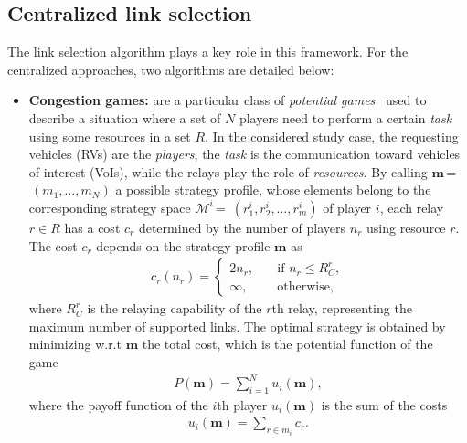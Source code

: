 \documentclass[journal]{IEEEtran}
\begin{document}
\subsection{Centralized link selection}

The link selection algorithm plays a key role in this framework. For the centralized approaches, two algorithms are detailed below:

\begin{itemize}[wide]
    \item \textbf{Congestion games:} are a particular class of \textit{potential games}~\cite{8334284} used to describe a situation where a set of $N$ players need to perform a certain \textit{task} using some resources in a set $R$. In the considered study case, the requesting vehicles (RVs) are the \textit{players}, the \textit{task} is the communication toward vehicles of interest (VoIs), while the relays play the role of \textit{resources}.
    By calling $\mathbf{m} \,$=$\,(m_1, \dots, m_N)$ a possible strategy profile, whose elements belong to the corresponding strategy space $\mathcal{M}^i$\,=\, $(r_1^{i}, r_2^{i}, \dots, r_m^{i})$ of player $i$, each relay $r\in R$ has a cost $c_r$ determined by the number of players $n_r$ using resource $r$.
    The cost $c_r$ %
    depends on the strategy profile $\mathbf{m}$ as %
    \begin{align}
        c_{r}(n_{r}) = 
        \begin{cases}
            2 n_r, \quad & \text{if $n_r\leq R_C^r $}, \\
            \infty, \quad & \text{otherwise,}
        \end{cases}
    \end{align}
    where $R_C^r$ is the relaying capability of the $r$th relay, representing the maximum number of supported links. 
    The optimal strategy is obtained by minimizing w.r.t $\mathbf{m}$ the total cost, which is the potential function of the game~\cite{8334284}
    \begin{align}
        P(\mathbf{m}) = %
        \sum_{i=1}^{N} u_i(\mathbf{m}),
    \end{align}
    where the payoff function of the $i$th player $u_i(\mathbf{m})$ is the sum of the costs
    \begin{align}
        u_i(\mathbf{m})=\sum_{r\in m_i} c_r.
    \end{align}
 

\end{itemize}
\end{document}
